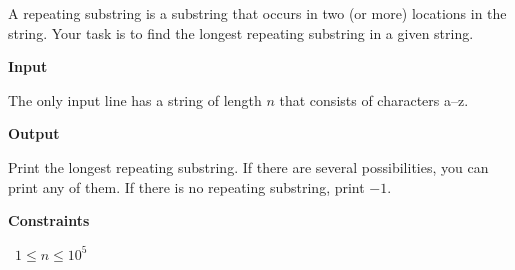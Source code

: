 A repeating substring is a substring that occurs in two (or more) locations in the string. Your task is to find the longest repeating substring in a given string.

\vspace{0.3cm}\noindent\textbf{Input}

The only input line has a string of length $n$ that consists of characters a–z.

\vspace{0.3cm}\noindent\textbf{Output}

Print the longest repeating substring. If there are several possibilities, you can print any of them. If there is no repeating substring, print $-1$.

\vspace{0.3cm}\noindent\textbf{Constraints}

\textbullet\ $1 \le n \le 10^5$
